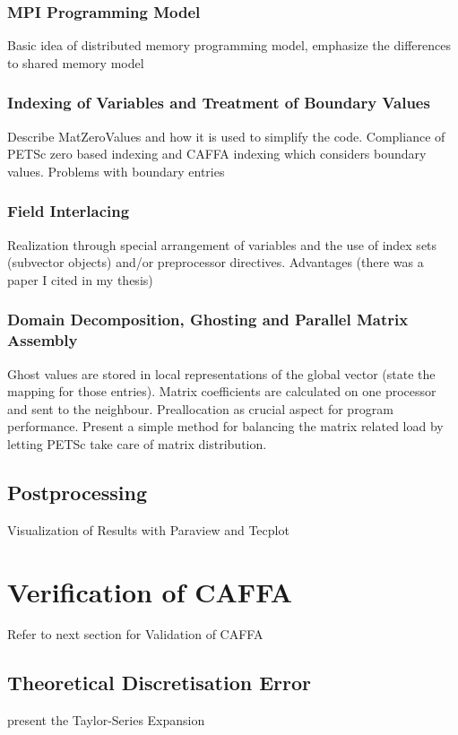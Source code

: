\documentclass[article,type=msc,colorback,accentcolor=tud2a]{tudthesis}
\begin{document}
      \subsubsection{MPI Programming Model}
        Basic idea of distributed memory programming model, emphasize the differences to shared memory model
      \subsubsection{Indexing of Variables and Treatment of Boundary Values}
      Describe MatZeroValues and how it is used to simplify the code. Compliance of PETSc zero based indexing and CAFFA indexing which considers boundary values. Problems with boundary entries
      \subsubsection{Field Interlacing}
      Realization through special arrangement of variables and the use of index sets (subvector objects) and/or preprocessor directives. Advantages (there was a paper I cited in my thesis)
      \subsubsection{Domain Decomposition, Ghosting and Parallel Matrix Assembly}

        Ghost values are stored in local representations of the global vector (state the mapping for those entries). Matrix coefficients are calculated on one processor and sent to the neighbour. Preallocation as crucial aspect for program performance. Present a simple method for balancing the matrix related load by letting PETSc take care of matrix distribution.

    \subsection{Postprocessing}
    
      Visualization of Results with Paraview and Tecplot

  \section{Verification of CAFFA}
    
    Refer to next section for Validation of CAFFA

    \subsection{Theoretical Discretisation Error}
      present the Taylor-Series Expansion
\end{document}
